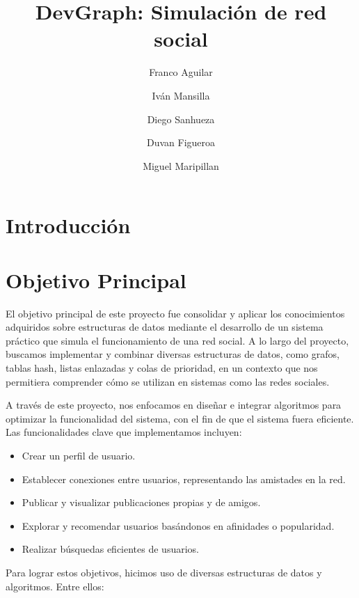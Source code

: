 \documentclass[9pt,letterpaper,onecolumn]{rho-class/rho}
\title{DevGraph: Simulación de red social}
\author[$\dagger$]{Franco Aguilar}
\author[$\dagger$]{Iván Mansilla}
\author[$\dagger$]{Diego Sanhueza}
\author[$\dagger$]{Duvan Figueroa}
\author[$\dagger$]{Miguel Maripillan}
\affil[$\dagger$]{Universidad de Magallanes}
\begin{document}
	
    \maketitle
    \thispagestyle{firststyle}
    \tableofcontents


\section{Introducción}


\section{Objetivo Principal}

El objetivo principal de este proyecto fue consolidar y aplicar los conocimientos adquiridos sobre estructuras de datos mediante el desarrollo de un sistema práctico que simula el funcionamiento de una red social. A lo largo del proyecto, buscamos implementar y combinar diversas estructuras de datos, como grafos, tablas hash, listas enlazadas y colas de prioridad, en un contexto que nos permitiera comprender cómo se utilizan en sistemas como las redes sociales.

A través de este proyecto, nos enfocamos en diseñar e integrar algoritmos para optimizar la funcionalidad del sistema, con el fin de que el sistema fuera eficiente. Las funcionalidades clave que implementamos incluyen:

\begin{itemize}
    \item Crear un perfil de usuario.
    \item Establecer conexiones entre usuarios, representando las amistades en la red.
    \item Publicar y visualizar publicaciones propias y de amigos.
    \item Explorar y recomendar usuarios basándonos en afinidades o popularidad.
    \item Realizar búsquedas eficientes de usuarios.
\end{itemize}

Para lograr estos objetivos, hicimos uso de diversas estructuras de datos y algoritmos. Entre ellos:
\end{document}
